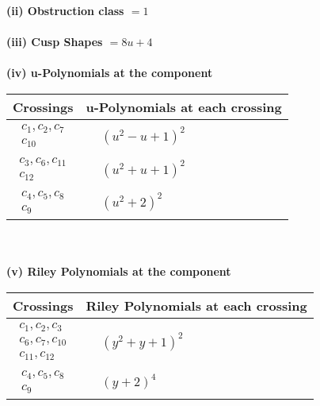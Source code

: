 \documentclass[1p]{elsarticle_modified}
\theoremstyle{definition}
\begin{document}
\flushleft \textbf{(ii) Obstruction class $= 1$}\\~\\
\flushleft \textbf{(iii) Cusp Shapes $= 8 u+4$}\\~\\
\newpage\renewcommand{\arraystretch}{1}
\flushleft \textbf{(iv) u-Polynomials at the component}\newline \\
\begin{tabular}{m{50pt}|m{274pt}}
Crossings & \hspace{64pt}u-Polynomials at each crossing \\
\hline $$\begin{aligned}c_{1},c_{2},c_{7}\\c_{10}\end{aligned}$$&$\begin{aligned}
&(u^2- u+1)^2
\end{aligned}$\\
\hline $$\begin{aligned}c_{3},c_{6},c_{11}\\c_{12}\end{aligned}$$&$\begin{aligned}
&(u^2+u+1)^2
\end{aligned}$\\
\hline $$\begin{aligned}c_{4},c_{5},c_{8}\\c_{9}\end{aligned}$$&$\begin{aligned}
&(u^2+2)^2
\end{aligned}$\\
\hline
\end{tabular}\\~\\
\newpage\renewcommand{\arraystretch}{1}
\flushleft \textbf{(v) Riley Polynomials at the component}\newline \\
\begin{tabular}{m{50pt}|m{274pt}}
Crossings & \hspace{64pt}Riley Polynomials at each crossing \\
\hline $$\begin{aligned}c_{1},c_{2},c_{3}\\c_{6},c_{7},c_{10}\\c_{11},c_{12}\end{aligned}$$&$\begin{aligned}
&(y^2+y+1)^2
\end{aligned}$\\
\hline $$\begin{aligned}c_{4},c_{5},c_{8}\\c_{9}\end{aligned}$$&$\begin{aligned}
&(y+2)^4
\end{aligned}$\\
\hline
\end{tabular}\\~\\
\end{document}
